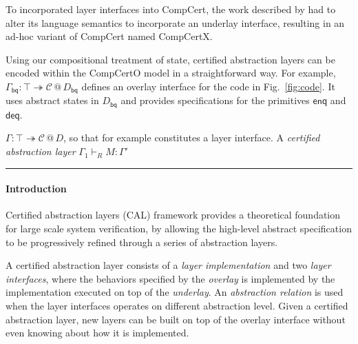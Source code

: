 \documentclass[acmsmall,screen,review,anonymous]{acmart}
\newcommand{\kw}[1]{\ensuremath{ \mathsf{#1} }}
\begin{document}
To incorporated layer interfaces into CompCert,
the work described by \citet{popl15}
had to alter its language semantics
to incorporate an underlay interface,
resulting in an ad-hoc variant of CompCert named CompCertX.

Using our compositional treatment of state,
certified abstraction layers can be encoded
within the CompCertO model
in a straightforward way.
For example,
$\Gamma_\kw{bq} : \top \twoheadrightarrow \mathcal{C} \mathbin@ D_\kw{bq}$
defines an overlay interface for the code in Fig.~\ref{fig:code}.
It uses abstract states in $D_\kw{bq}$
and provides specifications for the primitives $\kw{enq}$ and $\kw{deq}$.

$\Gamma : \top \twoheadrightarrow \mathcal{C} \mathbin@ D$,
so that for example
constitutes a layer interface.
A \emph{certified abstraction layer}
$\Gamma_1 \vdash_R M : \Gamma'$

\hrule

\paragraph{Introduction}
Certified abstraction layers (CAL) framework
provides a theoretical foundation
for large scale system verification,
by allowing
the high-level abstract specification
to be progressively refined
through a series of abstraction layers.

A certified abstraction layer consists of
a \emph{layer implementation}
and two \emph{layer interfaces},
where
the behaviors specified by the \emph{overlay}
is implemented
by the implementation executed on top of the \emph{underlay}.
An \emph{abstraction relation} is used
when the layer interfaces
operates on different abstraction level.
Given a certified abstraction layer,
new layers can be built on top of the overlay interface
without even knowing about how it is implemented.

\end{document}
